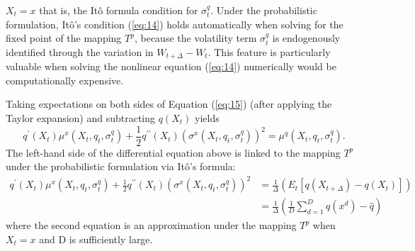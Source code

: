 \documentclass{article}
\begin{document}

\clearpage

$X_{t}=x$ that is, the Itô formula condition for $\sigma_{t}^{q}$. Under the probabilistic formulation, Itô's condition (\ref{eq:14}) holds automatically when solving for the fixed point of the mapping $T^p$, because the volatility term $\sigma_{t}^{q}$ is endogenously identified through the variation in $W_{t+\Delta}-W_{t}$. This feature is particularly valuable when solving the nonlinear equation (\ref{eq:14}) numerically would be computationally expensive.

Taking expectations on both sides of Equation (\ref{eq:15}) (after applying the Taylor expansion) and subtracting $q(X_{t})$ yields
\begin{equation}
q^{\prime}(X_{t})\mu^{x}(X_{t},q_{t},\sigma_{t}^{q})+\frac{1}{2}q^{\prime\prime}(X_{t})(\sigma^{x}(X_{t},q_{t},\sigma_{t}^{q}))^{2}=\mu^{q}(X_{t},q_{t},\sigma_{t}^{q}).
\label{eq:16}
\end{equation}
The left-hand side of the differential equation above is linked to the mapping $T^p$ under the probabilistic formulation via Itô's formula:
\begin{align*}
q^{\prime}(X_{t})\mu^{x}(X_{t},q_{t},\sigma_{t}^{q})+\frac{1}{2}q^{\prime\prime}(X_{t})(\sigma^{x}(X_{t},q_{t},\sigma_{t}^{q}))^{2}&=\frac{1}{\Delta}(E_{t}[q(X_{t+\Delta})-q(X_{t})]) \\
&=\frac{1}{\Delta}\left(\frac{1}{D}\sum_{d=1}^{D}q(x^{d})-\hat{q}\right)
\end{align*}
where the second equation is an approximation under the mapping $T^p$ when $X_{t}=x$ and D is sufficiently large.
\end{document}
